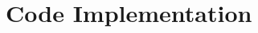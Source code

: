 \documentclass{article}
\begin{document}
\maketitle
\tableofcontents
\clearpage

\setcounter{secnumdepth}{0}





\appendix
\section{Code Implementation}
\inputminted{cpp}{ummrc.cpp}
\end{document}
